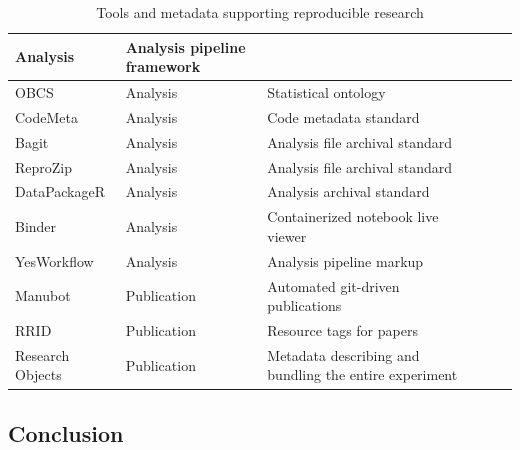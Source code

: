 \documentclass{drexelthesis}
\begin{document}
\begin{table}[H]
\begin{adjustbox}{max width=\textwidth}
\begin{tabular}{p{4.07cm}p{2.67cm}p{9.82cm}p{4.07cm}p{2.67cm}p{9.82cm}}
\multicolumn{1}{|p{2.67cm}}{Analysis} & 
\multicolumn{1}{|p{9.82cm}|}{Analysis pipeline framework} \\ 
\hline
\multicolumn{1}{|p{4.07cm}}{OBCS\cite{Zheng2016-cu}} & 
\multicolumn{1}{|p{2.67cm}}{Analysis} & 
\multicolumn{1}{|p{9.82cm}|}{Statistical ontology} \\ 
\hline
\multicolumn{1}{|p{4.07cm}}{CodeMeta\cite{Jones2016-dz}} & 
\multicolumn{1}{|p{2.67cm}}{Analysis} & 
\multicolumn{1}{|p{9.82cm}|}{Code metadata standard} \\ 
\hline
\multicolumn{1}{|p{4.07cm}}{Bagit\cite{Kunze2018-pn}} & 
\multicolumn{1}{|p{2.67cm}}{Analysis} & 
\multicolumn{1}{|p{9.82cm}|}{Analysis file archival standard} \\ 
\hline
\multicolumn{1}{|p{4.07cm}}{ReproZip\cite{Simonyan2017-st}} & 
\multicolumn{1}{|p{2.67cm}}{Analysis} & 
\multicolumn{1}{|p{9.82cm}|}{Analysis file archival standard} \\ 
\hline
\multicolumn{1}{|p{4.07cm}}{DataPackageR\cite{Finak2018-ai}} & 
\multicolumn{1}{|p{2.67cm}}{Analysis} & 
\multicolumn{1}{|p{9.82cm}|}{Analysis archival standard} \\ 
\hline
\multicolumn{1}{|p{4.07cm}}{Binder\cite{Jupyter2018-md}} & 
\multicolumn{1}{|p{2.67cm}}{Analysis} & 
\multicolumn{1}{|p{9.82cm}|}{Containerized notebook live viewer} \\ 
\hline
\multicolumn{1}{|p{4.07cm}}{YesWorkflow\cite{McPhillips2015-um}} & 
\multicolumn{1}{|p{2.67cm}}{Analysis} & 
\multicolumn{1}{|p{9.82cm}|}{Analysis pipeline markup} \\ 
\hline
\multicolumn{1}{|p{4.07cm}}{Manubot\cite{Himmelstein2019-dt}} & 
\multicolumn{1}{|p{2.67cm}}{Publication} & 
\multicolumn{1}{|p{9.82cm}|}{Automated git-driven publications} \\ 
\hline
\multicolumn{1}{|p{4.07cm}}{RRID\cite{Bandrowski2015-qu}} & 
\multicolumn{1}{|p{2.67cm}}{Publication} & 
\multicolumn{1}{|p{9.82cm}|}{Resource tags for papers} \\ 
\hline
\multicolumn{1}{|p{4.07cm}}{Research Objects\cite{Bechhofer2010-lr}} & 
\multicolumn{1}{|p{2.67cm}}{Publication } & 
\multicolumn{1}{|p{9.82cm}|}{Metadata describing and bundling the entire experiment} \\ 
\hline
\end{tabular}
\end{adjustbox}
\caption{Tools and metadata supporting reproducible research}
\end{table}

\subsection{Conclusion}
\end{document}
